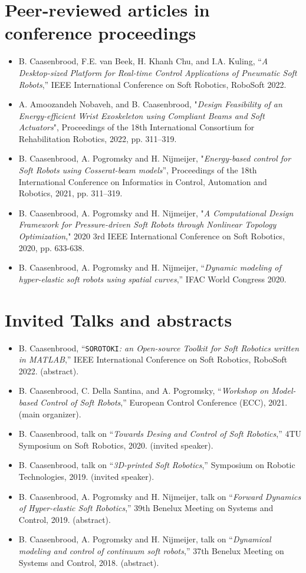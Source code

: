 \section*{Peer-reviewed articles in conference proceedings}
\begin{itemize}[leftmargin=4mm]
\item B. Caasenbrood, F.E. van Beek, H. Khanh Chu, and I.A. Kuling, “\textit{A Desktop-sized Platform for Real-time Control Applications of Pneumatic Soft Robots},” IEEE International Conference on Soft Robotics, RoboSoft 2022.
\item A. Amoozandeh Nobaveh, and B. Caasenbrood, "\textit{Design Feasibility of an Energy-efficient Wrist Exoskeleton
using Compliant Beams and Soft Actuators}", Proceedings of the 18th International  Consortium for Rehabilitation Robotics, 2022, pp. 311–319.
\item B. Caasenbrood, A. Pogromsky and H. Nijmeijer, "\textit{Energy-based control for Soft Robots using Cosserat-beam models}”, Proceedings of the 18th International Conference on Informatics in Control, Automation and Robotics, 2021, pp. 311–319.
\item B. Caasenbrood, A. Pogromsky and H. Nijmeijer, "\textit{A Computational Design Framework for Pressure-driven Soft Robots through Nonlinear Topology Optimization}," 2020 3rd IEEE International Conference on Soft Robotics, 2020, pp. 633-638.
\item B. Caasenbrood, A. Pogromsky and H. Nijmeijer, “\textit{Dynamic modeling of hyper-elastic soft robots using spatial curves},” IFAC World Congress 2020.
\end{itemize}

\section*{Invited Talks and abstracts}
\begin{itemize}[leftmargin=4mm]
\item B. Caasenbrood, “\texttt{SOROTOKI}\textit{: an Open-source Toolkit for Soft Robotics written in MATLAB},”  IEEE International Conference on Soft Robotics, RoboSoft 2022. (abstract).
\item B. Caasenbrood, C. Della Santina, and A. Pogromsky, “\textit{Workshop on Model-based Control of Soft Robots},” European Control Conference (ECC), 2021. (main organizer).
\item B. Caasenbrood, talk on  “\textit{Towards Desing and Control of Soft Robotics},” 4TU Symposium on Soft Robotics, 2020. (invited speaker).
\item B. Caasenbrood, talk on  “\textit{3D-printed Soft Robotics},” Symposium on Robotic Technologies, 2019. (invited speaker).
\item B. Caasenbrood, A. Pogromsky and H. Nijmeijer, talk on  “\textit{Forward Dynamics of Hyper-elastic Soft Robotics},” 39th Benelux Meeting on Systems and Control, 2019. (abstract).
\item B. Caasenbrood, A. Pogromsky and H. Nijmeijer, talk on  “\textit{Dynamical modeling and control of continuum soft robots},” 37th Benelux Meeting on Systems and Control, 2018. (abstract).
\end{itemize}


